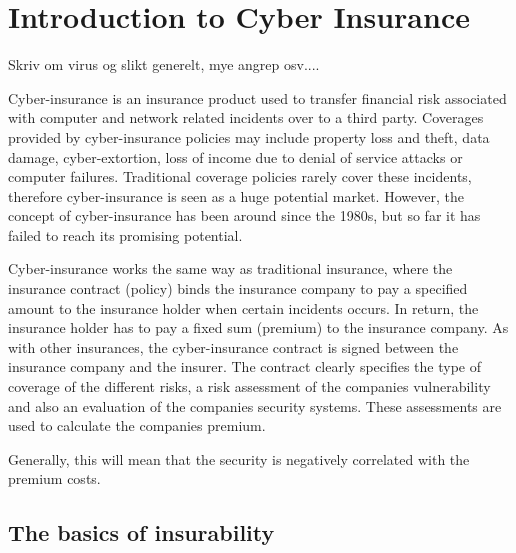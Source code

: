\chapter{Introduction to Cyber Insurance}
\label{chp:introductionToCyberInsurance} 

Skriv om virus og slikt generelt, mye angrep osv.... 

Cyber-insurance is an insurance product used to transfer financial risk
associated with computer and network related incidents over to a third party.
 Coverages provided by cyber-insurance policies may include property loss and
theft, data damage, cyber-extortion, loss of income due to denial of service attacks or computer failures. \cite{washingtonpaper}
Traditional coverage policies rarely cover these incidents, therefore cyber-insurance is seen as a huge potential market. However, the concept of cyber-insurance has been around since the 1980s, but so far it has failed to reach its promising potential. 
  
 

Cyber-insurance works the same way as traditional insurance, where the insurance contract (policy)
 binds the insurance company to pay a specified amount to the insurance holder when certain incidents
  occurs. In return, the insurance holder has to pay a fixed sum (premium) to the insurance company.
   \cite{robinson2012incentives}
    As with other insurances, the cyber-insurance contract is signed between the insurance company and
     the insurer. The contract clearly specifies the type of coverage of the different risks, a risk
      assessment of the companies vulnerability and also an evaluation of the companies security
       systems. These assessments are used to calculate the companies premium.


 \cite{robinson2012incentives} Generally, this will mean that the security is negatively correlated with the premium costs.  


\section{The basics of insurability}

